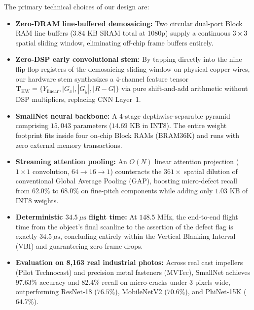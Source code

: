 \documentclass[conference]{IEEEtran}
\begin{document}
The primary technical choices of our design are:
\begin{itemize}
    \item \textbf{Zero-DRAM line-buffered demosaicing:} Two circular dual-port Block RAM line buffers ($3.84\text{ KB}$ SRAM total at 1080p) supply a continuous $3\times3$ spatial sliding window, eliminating off-chip frame buffers entirely.
    \item \textbf{Zero-DSP early convolutional stem:} By tapping directly into the nine flip-flop registers of the demosaicing sliding window on physical copper wires, our hardware stem synthesizes a 4-channel feature tensor $\mathbf{T}_{\text{HW}} = \{Y_{\text{linear}}, |G_x|, |G_y|, |R-G|\}$ via pure shift-and-add arithmetic without DSP multipliers, replacing CNN Layer~1.
    \item \textbf{SmallNet neural backbone:} A 4-stage depthwise-separable pyramid comprising $15,043$ parameters ($14.69\text{ KB}$ in INT8). The entire weight footprint fits inside four on-chip Block RAMs (BRAM36K) and runs with zero external memory transactions.
    \item \textbf{Streaming attention pooling:} An $O(N)$ linear attention projection ($1\times1$ convolution, $64 \to 16 \to 1$) counteracts the $361\times$ spatial dilution of conventional Global Average Pooling (GAP), boosting micro-defect recall from $62.0\%$ to $68.0\%$ on fine-pitch components while adding only $1.03\text{ KB}$ of INT8 weights.
    \item \textbf{Deterministic $34.5\ \mu\text{s}$ flight time:} At $148.5\text{ MHz}$, the end-to-end flight time from the object's final scanline to the assertion of the defect flag is exactly $34.5\ \mu\text{s}$, concluding entirely within the Vertical Blanking Interval (VBI) and guaranteeing zero frame drops.
    \item \textbf{Evaluation on 8,163 real industrial photos:} Across real cast impellers (Pilot Technocast) and precision metal fasteners (MVTec), SmallNet achieves $97.63\%$ accuracy and $82.4\%$ recall on micro-cracks under 3 pixels wide, outperforming ResNet-18 ($76.5\%$), MobileNetV2 ($70.6\%$), and PhiNet-15K ($64.7\%$).
\end{itemize}
\end{document}
